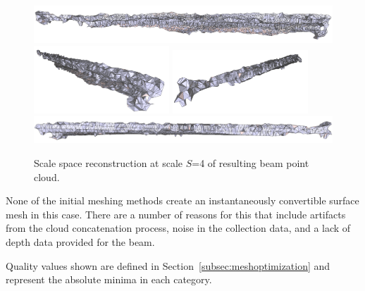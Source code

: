 \documentclass[12pt]{drexelthesis}
\begin{document}
\begin{figure}[!ht]
	\centering
		\includegraphics[width=5in]{real-lab-scans/meshedNeat/scalespace400.png}
		\includegraphics[width=2in]{real-lab-scans/meshedNeat/scalespace401.png}
		\includegraphics[width=2in]{real-lab-scans/meshedNeat/scalespace402.png}
		\includegraphics[width=5in]{real-lab-scans/meshedNeat/scalespace403.png}
		\caption[Scale space reconstruction at scale $S$=4 of segmented LiDAR data]{\centering Scale space reconstruction at scale $S$=4 of resulting beam point cloud.}
	\label{lidar:scalespace4}
\end{figure}

None of the initial meshing methods create an instantaneously convertible surface mesh in this case. There are a number of reasons for this that include artifacts from the cloud concatenation process, noise in the collection data, and a lack of depth data provided for the beam.

\begin{table}[!ht]
	\centering
		\caption[HDL-32E LiDAR scan initial mesh quality]{Quality analysis of initial meshing methods.}
	Quality values shown are defined in Section~\ref{subsec:meshoptimization} and represent the absolute minima in each category.
	\label{table:realInit}
\end{table}
\end{document}
